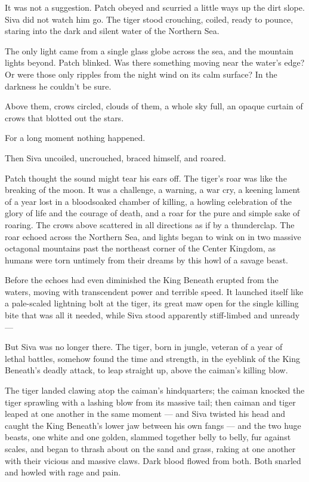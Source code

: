 \documentclass[ebook,oneside,openany,17pt]{memoir}
\begin{document}
It was not a suggestion. Patch obeyed and scurried a little ways up
the dirt slope. Siva did not watch him go. The tiger stood crouching,
coiled, ready to pounce, staring into the dark and silent water of the
Northern Sea.

The only light came from a single glass globe across the sea, and the
mountain lights beyond. Patch blinked. Was there something moving near
the water’s edge? Or were those only ripples from the night wind on
its calm surface? In the darkness he couldn’t be sure.

Above them, crows circled, clouds of them, a whole sky full, an opaque
curtain of crows that blotted out the stars.

For a long moment nothing happened.

Then Siva uncoiled, uncrouched, braced himself, and roared.

Patch thought the sound might tear his ears off. The tiger’s roar was
like the breaking of the moon. It was a challenge, a warning, a war
cry, a keening lament of a year lost in a bloodsoaked chamber of
killing, a howling celebration of the glory of life and the courage of
death, and a roar for the pure and simple sake of roaring. The crows
above scattered in all directions as if by a thunderclap. The roar
echoed across the Northern Sea, and lights began to wink on in two
massive octagonal mountains past the northeast corner of the Center
Kingdom, as humans were torn untimely from their dreams by this howl
of a savage beast.

Before the echoes had even diminished the King Beneath erupted from
the waters, moving with transcendent power and terrible speed. It
launched itself like a pale-scaled lightning bolt at the tiger, its
great maw open for the single killing bite that was all it needed,
while Siva stood apparently stiff-limbed and unready —

But Siva was no longer there. The tiger, born in jungle, veteran of a
year of lethal battles, somehow found the time and strength, in the
eyeblink of the King Beneath’s deadly attack, to leap straight up,
above the caiman’s killing blow.

The tiger landed clawing atop the caiman’s hindquarters; the caiman
knocked the tiger sprawling with a lashing blow from its massive tail;
then caiman and tiger leaped at one another in the same moment — and
Siva twisted his head and caught the King Beneath’s lower jaw between
his own fangs — and the two huge beasts, one white and one golden,
slammed together belly to belly, fur against scales, and began to
thrash about on the sand and grass, raking at one another with their
vicious and massive claws. Dark blood flowed from both. Both snarled
and howled with rage and pain.
\end{document}
